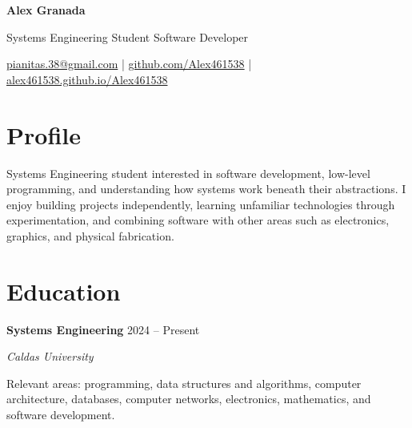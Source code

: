 \documentclass[10pt,a4paper]{article}
\newcommand{\cvname}[1]{
	{\Huge\bfseries #1}
}
\newcommand{\cvsubtitle}[1]{
	{\large\color{lightgray} #1}
}
\newcommand{\cvcontact}[3]{
	\small
	#1 \quad | \quad #2 \quad | \quad #3
}
\newcommand{\cventry}[4]{
	\textbf{#1}
	\hfill
	{\small\color{lightgray}#2}
	
	\textit{#3}
	
	#4
	
	\vspace{0.35em}
}
\begin{document}
	
	
	\begin{center}
		
		\cvname{Alex Granada}
		
		\vspace{0.25em}
		
		\cvsubtitle{Systems Engineering Student \textbar{} Software Developer}
		
		\vspace{0.45em}
		
		\cvcontact
		{\href{mailto:pianitas.38@gmail.com}{pianitas.38@gmail.com}}
		{\href{https://github.com/Alex461538}{github.com/Alex461538}}
		{\href{https://alex461538.github.io/Alex461538/}{alex461538.github.io/Alex461538}}
		
	\end{center}
	
	
	\section{Profile}
	
	Systems Engineering student interested in software development,
	low-level programming, and understanding how systems work beneath
	their abstractions. I enjoy building projects independently,
	learning unfamiliar technologies through experimentation, and
	combining software with other areas such as electronics,
	graphics, and physical fabrication.
	
	
	\section{Education}
	
	\cventry
	{Systems Engineering}
	{2024 -- Present}
	{Caldas University}
	{
		Relevant areas: programming, data structures and algorithms,
		computer architecture, databases, computer networks,
		electronics, mathematics, and software development.
	}
	
	
\end{document}
